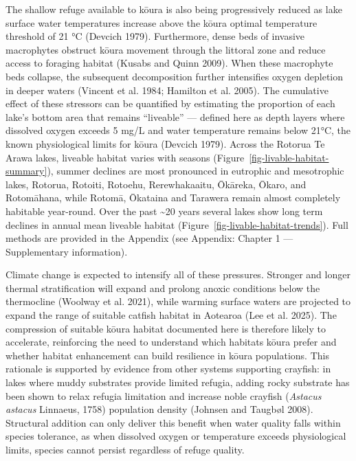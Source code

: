 \documentclass[
  12pt,
  a4paper,
  oneside]{scrbook}
\begin{document}
The shallow refuge available to kōura is also being progressively
reduced as lake surface water temperatures increase above the kōura
optimal temperature threshold of 21 °C (Devcich 1979). Furthermore,
dense beds of invasive macrophytes obstruct kōura movement through the
littoral zone and reduce access to foraging habitat (Kusabs and Quinn
2009). When these macrophyte beds collapse, the subsequent decomposition
further intensifies oxygen depletion in deeper waters (Vincent et al.
1984; Hamilton et al. 2005). The cumulative effect of these stressors
can be quantified by estimating the proportion of each lake's bottom
area that remains ``liveable'' --- defined here as depth layers where
dissolved oxygen exceeds 5 mg/L and water temperature remains below
21°C, the known physiological limits for kōura (Devcich 1979). Across
the Rotorua Te Arawa lakes, liveable habitat varies with seasons
(Figure~\ref{fig-livable-habitat-summary}), summer declines are most
pronounced in eutrophic and mesotrophic lakes, Rotorua, Rotoiti,
Rotoehu, Rerewhakaaitu, Ōkāreka, Ōkaro, and Rotomāhana, while Rotomā,
Ōkataina and Tarawera remain almost completely habitable year-round.
Over the past \textasciitilde20 years several lakes show long term
declines in annual mean liveable habitat
(Figure~\ref{fig-livable-habitat-trends}). Full methods are provided in
the Appendix (see Appendix: Chapter 1 --- Supplementary information).

Climate change is expected to intensify all of these pressures. Stronger
and longer thermal stratification will expand and prolong anoxic
conditions below the thermocline (Woolway et al. 2021), while warming
surface waters are projected to expand the range of suitable catfish
habitat in Aotearoa (Lee et al. 2025). The compression of suitable kōura
habitat documented here is therefore likely to accelerate, reinforcing
the need to understand which habitats kōura prefer and whether habitat
enhancement can build resilience in kōura populations. This rationale is
supported by evidence from other systems supporting crayfish: in lakes
where muddy substrates provide limited refugia, adding rocky substrate
has been shown to relax refugia limitation and increase noble crayfish
(\emph{Astacus astacus} Linnaeus, 1758) population density (Johnsen and
Taugbøl 2008). Structural addition can only deliver this benefit when
water quality falls within species tolerance, as when dissolved oxygen
or temperature exceeds physiological limits, species cannot persist
regardless of refuge quality.
\end{document}
